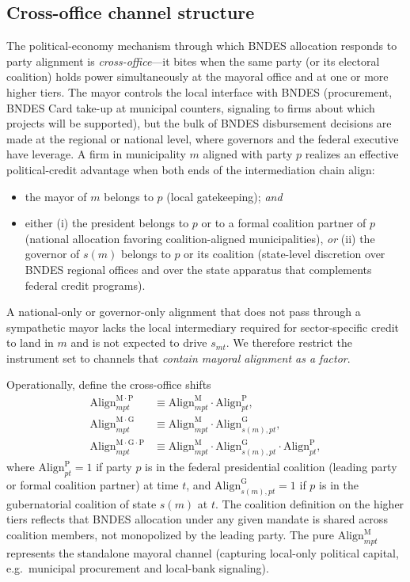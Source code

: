 \documentclass{article}
\newcommand{\Align}{\mathrm{Align}}
\theoremstyle{plain}
\theoremstyle{definition}
\theoremstyle{remark}
\begin{document}
\subsection{Cross-office channel structure}\label{subsec:cross-office}

The political-economy mechanism through which BNDES allocation responds
to party alignment is \emph{cross-office}---it bites when the same party (or its electoral coalition) holds power simultaneously at the mayoral office and at one or more higher tiers. The
mayor controls the local interface with BNDES (procurement, BNDES Card
take-up at municipal counters, signaling to firms about which projects
will be supported), but the bulk of BNDES disbursement decisions are made
at the regional or national level, where governors and the federal
executive have leverage. A firm in municipality $m$ aligned with party
$p$ realizes an effective political-credit advantage when both ends of
the intermediation chain align:
\begin{itemize}[leftmargin=*,nosep]
  \item the mayor of $m$ belongs to $p$ (local gatekeeping); \emph{and}
  \item either (i) the president belongs to $p$ or to a formal coalition
    partner of $p$ (national allocation favoring coalition-aligned
    municipalities), \emph{or} (ii) the governor of $s(m)$ belongs to
    $p$ or its coalition (state-level discretion over BNDES regional
    offices and over the state apparatus that complements federal
    credit programs).
\end{itemize}
A national-only or governor-only alignment that does not pass through a
sympathetic mayor lacks the local intermediary required for
sector-specific credit to land in $m$ and is not expected to drive
$s_{mt}$. We therefore restrict the instrument set to channels that
\emph{contain mayoral alignment as a factor}.

Operationally, define the cross-office shifts
\begin{align}
  \Align^{\mathrm{M{\cdot}P}}_{mpt}
    &\equiv \Align^{\mathrm{M}}_{mpt}\cdot\Align^{\mathrm{P}}_{pt},
    \label{eq:align-MP}\\
  \Align^{\mathrm{M{\cdot}G}}_{mpt}
    &\equiv \Align^{\mathrm{M}}_{mpt}\cdot\Align^{\mathrm{G}}_{s(m),pt},
    \label{eq:align-MG}\\
  \Align^{\mathrm{M{\cdot}G{\cdot}P}}_{mpt}
    &\equiv \Align^{\mathrm{M}}_{mpt}\cdot\Align^{\mathrm{G}}_{s(m),pt}
            \cdot\Align^{\mathrm{P}}_{pt},
    \label{eq:align-MGP}
\end{align}
where $\Align^{\mathrm{P}}_{pt}=1$ if party $p$ is in the federal
presidential coalition (leading party or formal coalition partner) at
time $t$, and $\Align^{\mathrm{G}}_{s(m),pt}=1$ if $p$ is in the
gubernatorial coalition of state $s(m)$ at $t$. The coalition definition
on the higher tiers reflects that BNDES allocation under any given
mandate is shared across coalition members, not monopolized by the
leading party. The pure $\Align^{\mathrm{M}}_{mpt}$ represents the standalone mayoral channel (capturing local-only
political capital, e.g.\ municipal procurement and local-bank
signaling).
\end{document}
